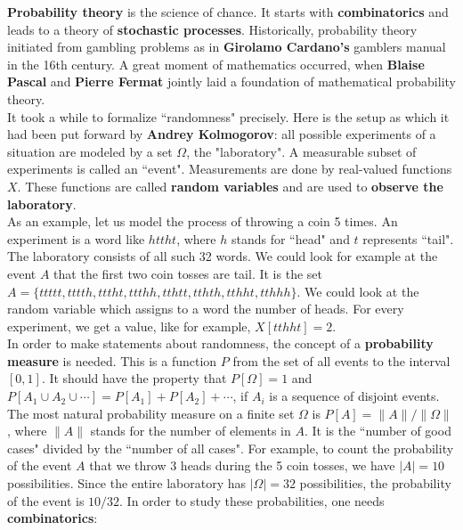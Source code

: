 \documentclass[12pt]{amsart}
\newcounter{example}    \def\example#1{ \item \fontsize{12}{15} \selectfont #1 \fontsize{12}{15} \selectfont }
\begin{document}
{\bf Probability theory} is the science of chance.  It starts with {\bf combinatorics} and leads to a theory of 
{\bf stochastic processes}. Historically, probability theory initiated from gambling problems as in
{\bf Girolamo Cardano's} gamblers manual in the 16th century. A great moment of mathematics occurred, when 
{\bf Blaise Pascal} and {\bf Pierre Fermat} jointly laid a foundation of mathematical probability theory.  \\
It took a while to formalize ``randomness" precisely. Here is the setup as which it had been put forward
by {\bf Andrey Kolmogorov}: all possible experiments of a situation are modeled by a set $\Omega$, the "laboratory".
A measurable subset of experiments is called an ``event". Measurements are 
done by real-valued functions $X$. These functions are called {\bf random variables} and are used to 
{\bf observe the laboratory}. \\
As an example, let us model the process of throwing a coin 5 times. An experiment is a 
word like $httht$, where $h$ stands for ``head" and $t$ represents ``tail".  The laboratory consists of all
such 32 words. We could look for example at the event $A$ that the first two coin tosses are tail. 
It is the set $A=\{ttttt,tttth,tttht,ttthh,tthtt,tthth,tthht,tthhh\}$.
We could look at the random variable which assigns to a word the number of heads. For every experiment, 
we get a value, like for example, $X[tthht]=2$.  \\
In order to make statements about randomness, the concept of a {\bf probability measure} is needed. 
This is a function $P$ from the set of all events to the interval $[0,1]$. It should have the property that 
$P[\Omega]=1$ and $P[A_1 \cup A_2  \cup \cdots ] = P[A_1] + P[A_2]+ \cdots$, if $A_i$ is a sequence of
disjoint events.  \\
The most natural probability measure on a finite set $\Omega$ is $P[A] = \|A\|/\|\Omega\|$, where $\|A\|$ 
stands for the number of elements in $A$. It is the ``number of good cases" divided by the ``number of all cases". 
For example, to count the probability of the event $A$ that we throw $3$ heads during the 5 coin tosses,
we have $|A|=10$ possibilities. Since the entire laboratory has $|\Omega|=32$ possibilities, the probability 
of the event is $10/32$. In order to study these probabilities, one needs {\bf combinatorics}: 
\end{document}
